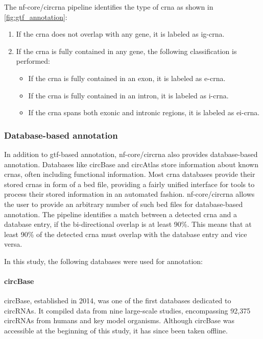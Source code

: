 The nf-core/circrna pipeline identifies the type of \gls{crna} as shown in
\cref{fig:gtf_annotation}: \begin{enumerate} \item If the \gls{crna} does not
            overlap with any gene, it is labeled as \gls{ig-crna}.
      \item If the \gls{crna} is fully contained in any gene, the following
            classification is performed:
            \begin{itemize}
                  \item If the \gls{crna} is fully contained in an exon, it is
                        labeled as \gls{e-crna}.
                  \item If the \gls{crna} is fully contained in an intron, it
                        is
                        labeled as \gls{i-crna}.
                  \item If the \gls{crna} spans both exonic and intronic
                        regions,
                        it is labeled as \gls{ei-crna}.
            \end{itemize}
\end{enumerate}

\subsubsection{Database-based annotation}
\label{sec:database_annotation}
In addition to \gls{gtf}-based annotation, nf-core/circrna also provides
database-based annotation.
Databases like circBase and circAtlas store information about known
\glspl{crna}, often including functional
information\supercite{glazar_circbase_2014,wu_circatlas_2023}.
Most \gls{crna} databases provide their stored \glspl{crna} in form of a
\gls{bed} file, providing a fairly unified interface for tools to process their
stored information in an automated fashion.
nf-core/circrna allows the user to provide an arbitrary number of such
\gls{bed}
files for database-based annotation.
The pipeline identifies a match between a detected \gls{crna} and a database
entry, if the bi-directional overlap is at least 90\%.
This means that at least 90\% of the detected \gls{crna} must overlap with the
database entry and vice versa.

In this study, the following databases were used for annotation:

\paragraph{circBase} circBase, established in 2014, was one of the first
databases dedicated to circRNAs.
It compiled data from nine large-scale studies, encompassing 92,375 circRNAs
from humans and key model organisms\supercite{glazar_circbase_2014}.
Although circBase was accessible at the beginning of this study, it has since
been taken offline.

